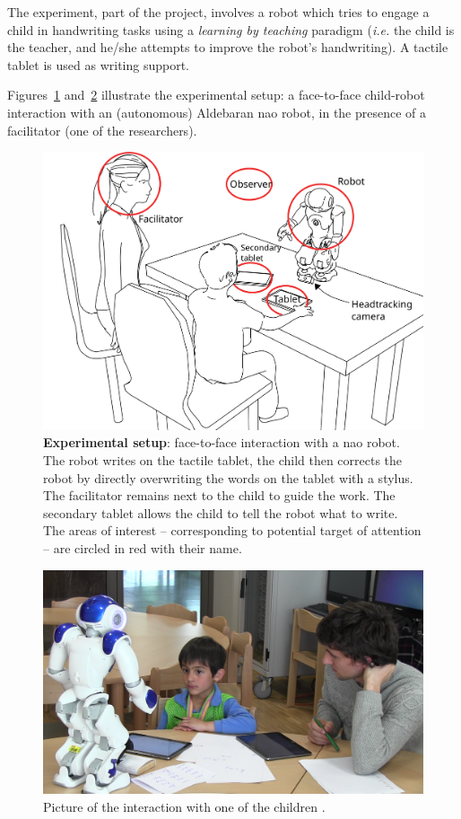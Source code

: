 \documentclass{sig-alternate}
\newcommand{\ie}{\textit{i.e.}\xspace}
\newcommand{\redacted}{\textit{\sc [REDACTED FOR REVIEW]}\xspace}
\begin{document}
The experiment, part of the \redacted project, involves a robot
which tries to engage a child in handwriting tasks using a \emph{learning by
teaching} paradigm (\ie the child is the teacher, and he/she attempts to improve
the robot's handwriting). A tactile tablet is used as writing support.

Figures~\ref{fig:setup} and~\ref{fig:realSetup} illustrate the experimental
setup: a face-to-face child-robot interaction with an (autonomous) Aldebaran
{\sc nao} robot, in the presence of a facilitator (one of the researchers).

\begin{figure}[h!]
    \centering
    \includegraphics[width=0.8\columnwidth]{experimental_setup}
    \caption{\small \textbf{Experimental setup}: face-to-face interaction with a {\sc
            nao} robot. The robot writes on the tactile tablet, the child then
            corrects the robot by directly overwriting the words on the tablet
            with a stylus. The facilitator remains next to the child to guide the work. 
            The secondary tablet allows the child to tell the robot what to
            write. The areas of interest -- corresponding to potential target of
            attention -- are circled in red with their name.}
    \label{fig:setup}
\end{figure}


\begin{figure}[h!]
    \centering
    \includegraphics[width=1\columnwidth]{realSetup}
    \caption{\small Picture of the interaction with one of the children
    {\it{}}.}
    \label{fig:realSetup}
\end{figure}
\end{document}
